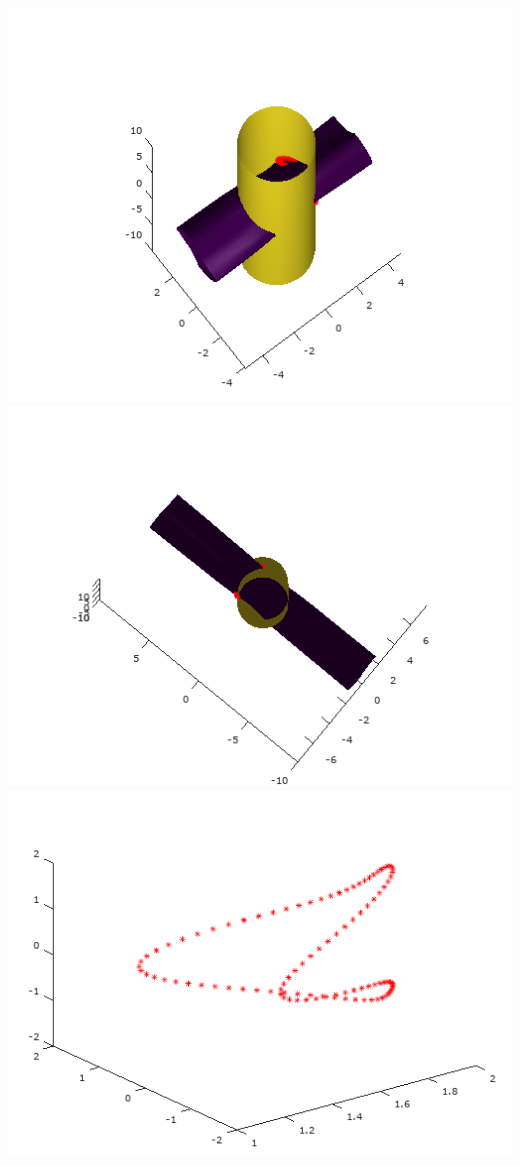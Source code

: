 \documentclass[]{article}
\begin{document}
	\includegraphics[scale=0.5]{primer8_2}
	\includegraphics[scale=0.5]{primer8_3}
	\includegraphics[scale=0.5]{primer8_4} 
	\\	
\end{document}
